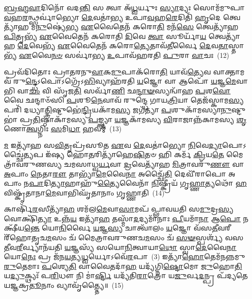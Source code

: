 {\anuvakamend[{\-\ul{𑌸𑍍𑌯𑌾}\-𑌦𑌿𑌨𑍍𑌦𑍍𑌰𑍋᳴ 𑌗𑍃\-\ul{𑌹𑍍𑌣𑍀}\-𑌯𑌾𑌦᳴\-\ul{𑌸𑍍𑌤𑍍𑌵}\-𑌮𑍁𑌷𑍍𑌮𑌿᳴\-\ul{𑌨𑍍𑌕𑍍𑌰𑌿}\-𑌯\-\ul{𑌤𑍇} 𑌷𑌡𑍍𑌵𑌿𑍞᳴𑌶𑌤𑌿𑌶𑍍𑌚}]}%

\-\ul{𑌬𑍍𑌰}\-\-\ul{𑌹𑍍𑌮}\-\-\ul{𑌵𑌾}\-𑌦𑌿𑌨𑍋᳴ 𑌵𑌦\-\ul{𑌨𑍍𑌤𑌿} 𑌸 𑌤𑍍𑌵𑌾 𑌅᳴\-\ul{𑌧𑍍𑌵}\-𑌰𑍍𑌯𑍁𑌃 \ul{𑌸𑍍𑌯𑌾}\-𑌦𑍍𑌯𑌃 𑌸𑍋𑌮᳴𑌮𑍁𑌪𑌾\-\ul{𑌵}\-𑌹\-\ul{𑌰}\-𑌨𑍍𑌥𑍍𑌸𑌰𑍍𑌵𑌾॑𑌭𑍍𑌯𑍋 \ul{𑌦𑍇}\-𑌵𑌤𑌾॑𑌭𑍍𑌯 𑌉𑌪𑌾\-\ul{𑌵}\-𑌹\-\ul{𑌰𑍇}\-𑌦𑌿𑌤𑌿᳴ \ul{𑌹𑍃}\-𑌦𑍇 𑌤𑍍𑌵𑍇𑌤𑍍𑌯𑌾᳴𑌹 𑌮\-\ul{𑌨𑍁}\-𑌷𑍍𑌯𑍇॑𑌭𑍍𑌯 \ul{𑌏}\-𑌵𑍈𑌤𑍇𑌨᳴ 𑌕𑌰𑍋\-\ul{𑌤𑌿} 𑌮𑌨᳴\-\ul{𑌸𑍇} 𑌤𑍍𑌵𑍇𑌤𑍍𑌯𑌾᳴𑌹 \ul{𑌪𑌿}\-𑌤𑍃𑌭𑍍𑌯᳴ \ul{𑌏}\-𑌵𑍈𑌤𑍇𑌨᳴ 𑌕𑌰𑍋𑌤𑌿 \ul{𑌦𑌿}\-𑌵𑍇 \ul{𑌤𑍍𑌵𑌾} 𑌸𑍂𑌰𑍍𑌯𑌾᳴\-\ul{𑌯} 𑌤𑍍𑌵𑍇𑌤𑍍𑌯𑌾᳴𑌹 \ul{𑌦𑍇}\-𑌵𑍇𑌭𑍍𑌯᳴ \ul{𑌏}\-𑌵𑍈𑌤𑍇𑌨᳴ 𑌕𑌰𑍋\-\ul{𑌤𑍍𑌯𑍇}\-𑌤𑌾𑌵᳴\-\ul{𑌤𑍀}\-𑌰𑍍𑌵𑍈 \ul{𑌦𑍇}\-𑌵\-\ul{𑌤𑌾}\-𑌸𑍍𑌤𑌾𑌭𑍍𑌯᳴ \ul{𑌏}\-𑌵𑍈\-\ul{𑌨}\-\-\ul{𑍞} 𑌸𑌰𑍍𑌵𑌾॑𑌭𑍍𑌯 \ul{𑌉}\-𑌪𑌾𑌵᳴𑌹𑌰𑌤𑌿 \ul{𑌪𑍁}\-𑌰𑌾 \ul{𑌵𑌾}\-𑌚𑌃~(12)

𑌪𑍍𑌰𑌵᳴𑌦𑌿𑌤𑍋𑌃 𑌪𑍍𑌰𑌾𑌤𑌰𑌨𑍁\-\ul{𑌵𑌾}\-𑌕\-\ul{𑌮𑍁}\-𑌪𑌾𑌕᳴𑌰𑍋\-\ul{𑌤𑌿} 𑌯𑌾𑌵᳴\-\ul{𑌤𑍍𑌯𑍇}\-𑌵 𑌵𑌾𑌕𑍍𑌤𑌾𑌮𑌵᳴ 𑌰𑍁\-\ul{𑌨𑍍𑌦𑍍𑌧𑍇}\-\-𑌽𑌪𑍋\-𑌽𑌗𑍍𑌰𑍇᳴\-𑌽\-\ul{𑌭𑌿}\-𑌵𑍍𑌯𑌾𑌹᳴𑌰𑌤𑌿 \ul{𑌯}\-𑌜𑍍𑌞𑍋 𑌵𑌾 𑌆𑌪𑍋᳴ \ul{𑌯}\-𑌜𑍍𑌞\-\ul{𑌮𑍇}\-𑌵𑌾𑌭𑌿 𑌵𑌾\-\ul{𑌚𑌂} 𑌵𑌿 𑌸𑍃᳴𑌜\-\ul{𑌤𑌿} 𑌸𑌰𑍍𑌵𑌾᳴\-\ul{𑌣𑌿} 𑌛\-\ul{𑌨𑍍𑌦𑌾}\-\-\ul{𑍟}\-𑌸𑍍𑌯𑌨𑍍𑌵𑌾᳴𑌹 \ul{𑌪}\-𑌶\-\ul{𑌵𑍋} 𑌵𑍈 𑌛𑌨𑍍𑌦𑌾𑍞᳴𑌸𑌿 \ul{𑌪}\-𑌶𑍂\-\ul{𑌨𑍇}\-𑌵𑌾𑌵᳴ 𑌰𑍁𑌨𑍍𑌦𑍍𑌧𑍇 𑌗𑌾𑌯\-\ul{𑌤𑍍𑌰𑌿}\-𑌯𑌾 𑌤𑍇𑌜᳴𑌸𑍍𑌕𑌾𑌮\-\ul{𑌸𑍍𑌯} 𑌪𑌰𑌿᳴ 𑌦𑌧𑍍𑌯𑌾\-\ul{𑌤𑍍𑌤𑍍𑌰𑌿}\-𑌷𑍍𑌟𑍁𑌭𑍇॑\-\ul{𑌨𑍍𑌦𑍍𑌰𑌿}\-𑌯𑌕𑌾᳴𑌮\-\ul{𑌸𑍍𑌯} 𑌜𑌗᳴𑌤𑍍𑌯𑌾 \ul{𑌪}\-𑌶𑍁𑌕𑌾᳴𑌮𑌸𑍍𑌯𑌾\-\ul{𑌨𑍁}\-𑌷𑍍𑌟𑍁𑌭𑌾॑ 𑌪𑍍𑌰\-\ul{𑌤𑌿}\-𑌷𑍍𑌠𑌾𑌕𑌾᳴𑌮𑌸𑍍𑌯 \ul{𑌪}\-𑌙𑍍𑌕𑍍𑌤𑍍𑌯𑌾 \ul{𑌯}\-𑌜𑍍𑌞𑌕𑌾᳴𑌮𑌸𑍍𑌯 \ul{𑌵𑌿}\-𑌰𑌾𑌜𑌾𑌨𑍍𑌨᳴𑌕𑌾𑌮𑌸𑍍𑌯 \ul{𑌶𑍃}\-𑌣𑍋\-\ul{𑌤𑍍𑌵}\-𑌗𑍍𑌨𑌿𑌃 \ul{𑌸}\-𑌮𑌿\-\ul{𑌧𑌾} 𑌹𑌵𑌮𑍍॑~(13)

\-\ul{𑌮} 𑌇𑌤𑍍𑌯𑌾᳴𑌹 𑌸\-\ul{𑌵𑌿}\-𑌤𑍃𑌪𑍍𑌰᳴𑌸𑍂𑌤 \ul{𑌏}\-𑌵 \ul{𑌦𑍇}\-𑌵𑌤𑌾॑𑌭𑍍𑌯𑍋 \ul{𑌨𑌿}\-𑌵𑍇\-\ul{𑌦𑍍𑌯𑌾}\-𑌪𑍋\-𑌽𑌚𑍍𑌛𑍈॑\-\ul{𑌤𑍍𑌯}\-𑌪 𑌇᳴𑌷𑍍𑌯 𑌹𑍋\-\ul{𑌤}\-𑌰𑌿𑌤𑍍𑌯𑌾᳴𑌹𑍇\-\ul{𑌷𑌿}\-𑌤𑍞 𑌹𑌿 𑌕𑌰𑍍𑌮᳴ \ul{𑌕𑍍𑌰𑌿}\-𑌯\-\ul{𑌤𑍇} 𑌮𑍈𑌤𑍍𑌰𑌾᳴𑌵𑌰𑍁𑌣𑌸𑍍𑌯 𑌚𑌮𑌸𑌾𑌧𑍍𑌵\-\ul{𑌰𑍍𑌯}\-𑌵𑌾 \ul{𑌦𑍍𑌰}\-𑌵𑍇𑌤𑍍𑌯𑌾᳴𑌹 \ul{𑌮𑌿}\-𑌤𑍍𑌰𑌾𑌵𑌰𑍁᳴\-\ul{𑌣𑍗} 𑌵𑌾 \ul{𑌅}\-𑌪𑌾𑌂 \ul{𑌨𑍇}\-𑌤𑌾\-\ul{𑌰𑍗} 𑌤𑌾𑌭𑍍𑌯𑌾᳴\-\ul{𑌮𑍇}\-𑌵𑍈\-\ul{𑌨𑌾} 𑌅𑌚𑍍𑌛𑍈᳴\-\ul{𑌤𑌿} 𑌦𑍇𑌵𑍀᳴𑌰𑌾𑌪𑍋 𑌅𑌪𑌾𑌂 𑌨\-\ul{𑌪𑌾}\-𑌦𑌿\-\ul{𑌤𑍍𑌯𑌾}\-𑌹𑌾𑌹𑍁᳴\-\ul{𑌤𑍍𑌯𑍈}\-𑌵𑍈𑌨𑌾᳴ \ul{𑌨𑌿}\-𑌷𑍍𑌕𑍍𑌰𑍀𑌯᳴ 𑌗𑍃\-\ul{𑌹𑍍𑌣𑌾}\-𑌤𑍍𑌯𑌥𑍋᳴ \ul{𑌹}\-𑌵𑌿𑌷𑍍𑌕𑍃᳴𑌤𑌾𑌨𑌾\-\ul{𑌮𑍇}\-𑌵𑌾𑌭𑌿𑌘𑍃᳴𑌤𑌾𑌨𑌾𑌂 𑌗𑍃𑌹𑍍𑌣𑌾𑌤𑌿~(14)

𑌕𑌾𑌰𑍍\mbox{}𑌷𑌿᳴\-\ul{𑌰}\-𑌸𑍀𑌤𑍍𑌯𑌾᳴\-\ul{𑌹} 𑌶𑌮᳴𑌲\-\ul{𑌮𑍇}\-𑌵𑌾\-\ul{𑌸𑌾}\-𑌮𑌪᳴ 𑌪𑍍𑌲𑌾𑌵𑌯𑌤𑌿 𑌸\-\ul{𑌮𑍁}\-𑌦𑍍𑌰\-\ul{𑌸𑍍𑌯} 𑌵𑍋𑌕𑍍𑌷𑌿᳴\-\ul{𑌤𑍍𑌯𑌾} 𑌉𑌨𑍍𑌨᳴\-\ul{𑌯} 𑌇𑌤𑍍𑌯𑌾᳴\-\ul{𑌹} 𑌤𑌸𑍍𑌮𑌾᳴\-\ul{𑌦}\-𑌦𑍍𑌯𑌮𑌾᳴𑌨𑌾𑌃 \ul{𑌪𑍀}\-𑌯𑌮𑌾᳴\-\ul{𑌨𑌾} 𑌆\-\ul{𑌪𑍋} 𑌨 𑌕𑍍𑌷𑍀᳴𑌯\-\ul{𑌨𑍍𑌤𑍇} 𑌯𑍋\-\ul{𑌨𑌿}\-𑌰𑍍𑌵𑍈 \ul{𑌯}\-𑌜𑍍𑌞\-\ul{𑌸𑍍𑌯} 𑌚𑌾𑌤𑍍𑌵𑌾᳴𑌲𑌂 \ul{𑌯}\-𑌜𑍍𑌞𑍋 𑌵᳴𑌸\-\ul{𑌤𑍀}\-𑌵𑌰𑍀𑌰𑍍\mbox{}᳴𑌹𑍋𑌤𑍃𑌚\-\ul{𑌮}\-𑌸𑌂 𑌚᳴ 𑌮𑍈𑌤𑍍𑌰𑌾𑌵𑌰𑍁𑌣𑌚\-\ul{𑌮}\-𑌸𑌂 𑌚᳴ \ul{𑌸}\-\-\ul{𑍟}\-𑌸𑍍𑌪𑌰𑍍𑌶𑍍𑌯᳴ 𑌵𑌸\-\ul{𑌤𑍀}\-𑌵\-\ul{𑌰𑍀}\-𑌰𑍍𑌵𑍍𑌯𑌾𑌨᳴𑌯𑌤𑌿 \ul{𑌯}\-𑌜𑍍𑌞𑌸𑍍𑌯᳴ 𑌸𑌯𑍋\-\ul{𑌨𑌿}\-𑌤𑍍𑌵𑌾𑌯𑌾\-\ul{𑌥𑍋} 𑌸𑍍𑌵𑌾\-\ul{𑌦𑍇}\-𑌵𑍈\-\ul{𑌨𑌾} 𑌯𑍋\-\ul{𑌨𑍇𑌃} 𑌪𑍍𑌰 𑌜᳴𑌨\-\ul{𑌯}\-𑌤𑍍𑌯\-\ul{𑌧𑍍𑌵}\-𑌰𑍍𑌯𑍋\-𑌽𑌵𑍇᳴\-\ul{𑌰}\-𑌪𑌾~(3) 𑌇𑌤𑍍𑌯𑌾᳴\-\ul{𑌹𑍋}\-𑌤𑍇𑌮᳴𑌨𑌨𑍍𑌨𑌮𑍁\-\ul{𑌰𑍁}\-𑌤𑍇𑌮𑌾𑌃 \ul{𑌪}\-𑌶𑍍𑌯𑍇\-\ul{𑌤𑌿} 𑌵𑌾𑌵𑍈𑌤𑌦𑌾᳴\-\ul{𑌹} 𑌯𑌦𑍍𑌯᳴𑌗𑍍𑌨𑌿\-\ul{𑌷𑍍𑌟𑍋}\-𑌮𑍋 \ul{𑌜𑍁}\-𑌹𑍋\-\ul{𑌤𑌿} 𑌯\-\ul{𑌦𑍍𑌯𑍁}\-𑌕𑍍𑌥𑍍𑌯𑌃᳴ 𑌪\-\ul{𑌰𑌿}\-𑌧𑍗 𑌨𑌿 𑌮𑌾॑\-\ul{𑌰𑍍𑌷𑍍𑌟𑌿} 𑌯𑌦𑍍𑌯᳴𑌤𑌿\-\ul{𑌰𑌾}\-𑌤𑍍𑌰𑍋 𑌯\-\ul{𑌜𑍁}\-𑌰𑍍𑌵\-\ul{𑌦}\-𑌨𑍍𑌪𑍍𑌰 𑌪᳴𑌦𑍍𑌯𑌤𑍇 𑌯𑌜𑍍𑌞𑌕𑍍𑌰\-\ul{𑌤𑍂}\-𑌨𑌾𑌂 𑌵𑍍𑌯𑌾𑌵𑍃᳴𑌤𑍍𑌤𑍍𑌯𑍈॥~(15)

